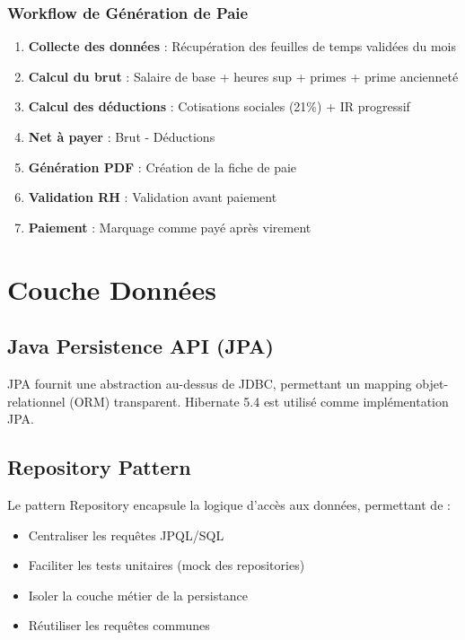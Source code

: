 \documentclass[12pt,a4paper,twoside]{report}
\begin{document}
\subsubsection{Workflow de Génération de Paie}

\begin{enumerate}
    \item \textbf{Collecte des données} : Récupération des feuilles de temps validées du mois
    \item \textbf{Calcul du brut} : Salaire de base + heures sup + primes + prime ancienneté
    \item \textbf{Calcul des déductions} : Cotisations sociales (21\%) + IR progressif
    \item \textbf{Net à payer} : Brut - Déductions
    \item \textbf{Génération PDF} : Création de la fiche de paie
    \item \textbf{Validation RH} : Validation avant paiement
    \item \textbf{Paiement} : Marquage comme payé après virement
\end{enumerate}

\section{Couche Données}

\subsection{Java Persistence API (JPA)}

JPA fournit une abstraction au-dessus de JDBC, permettant un mapping objet-relationnel (ORM) transparent. Hibernate 5.4 est utilisé comme implémentation JPA.

\subsection{Repository Pattern}

Le pattern Repository encapsule la logique d'accès aux données, permettant de :
\begin{itemize}
    \item Centraliser les requêtes JPQL/SQL
    \item Faciliter les tests unitaires (mock des repositories)
    \item Isoler la couche métier de la persistance
    \item Réutiliser les requêtes communes
\end{itemize}
\end{document}
